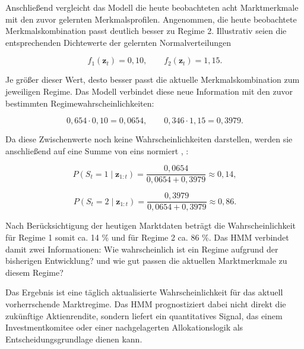 \vspace{0.5cm}

Anschließend vergleicht das Modell die heute beobachteten acht Marktmerkmale mit den zuvor gelernten Merkmalsprofilen. Angenommen, die heute beobachtete Merkmalskombination passt deutlich besser zu Regime 2. Illustrativ seien die entsprechenden Dichtewerte der gelernten Normalverteilungen

$$
f_1(\mathbf{z}_t)=0{,}10,
\qquad
f_2(\mathbf{z}_t)=1{,}15.
$$

Je größer dieser Wert, desto besser passt die aktuelle Merkmalskombination zum jeweiligen Regime. Das Modell verbindet diese neue Information mit den zuvor bestimmten Regimewahrscheinlichkeiten:

$$
0{,}654 \cdot 0{,}10 = 0{,}0654,
\qquad
0{,}346 \cdot 1{,}15 = 0{,}3979.
$$

Da diese Zwischenwerte noch keine Wahrscheinlichkeiten darstellen, werden sie anschließend auf eine Summe von eins normiert \cite[263]{rabiner_tutorial_1989}, \cite[233]{elliott_application_1997}:

$$
P(S_t=1\mid\mathbf{z}_{1:t})
=
\frac{0{,}0654}{0{,}0654+0{,}3979}
\approx 0{,}14,
$$

$$
P(S_t=2\mid\mathbf{z}_{1:t})
=
\frac{0{,}3979}{0{,}0654+0{,}3979}
\approx 0{,}86.
$$

Nach Berücksichtigung der heutigen Marktdaten beträgt die Wahrscheinlichkeit für Regime 1 somit ca. 14 \% und für Regime 2 ca. 86 \%. Das HMM verbindet damit zwei Informationen: Wie wahrscheinlich ist ein Regime aufgrund der bisherigen Entwicklung? und wie gut passen die aktuellen Marktmerkmale zu diesem Regime?

\vspace{0.5cm}

Das Ergebnis ist eine täglich aktualisierte Wahrscheinlichkeit für das aktuell vorherrschende Marktregime. Das HMM prognostiziert dabei nicht direkt die zukünftige Aktienrendite, sondern liefert ein quantitatives Signal, das einem Investmentkomitee oder einer nachgelagerten Allokationslogik als Entscheidungsgrundlage dienen kann.


